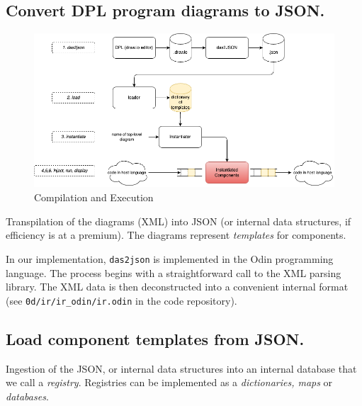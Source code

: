 \documentclass[10pt,anonymous,review]{acmart}
\begin{document}
\subsection{Convert DPL program diagrams to JSON.}
\begin{figure}[h]
    \includegraphics[scale=0.4]{./media/full.png}
    \caption{Compilation and Execution}
    \label{fig:full}
\end{figure}


  Transpilation of the diagrams (XML) into JSON (or internal data structures, if efficiency is at a premium). The diagrams represent \emph{templates} for components.
  
  In our implementation, \texttt{das2json} is implemented\cite{d2jrepo} in the Odin programming language. The process begins with a straightforward call to the XML parsing library. The XML data is then deconstructed into a convenient internal format (see \texttt{0d/ir/ir\_odin/ir.odin} in the code repository).
%
  
\subsection{Load component templates from JSON.}
  Ingestion of the JSON, or internal data structures into an internal database that we call a \emph{registry}. Registries can be implemented as a \emph{dictionaries, maps} or \emph{databases}.
%
\end{document}

